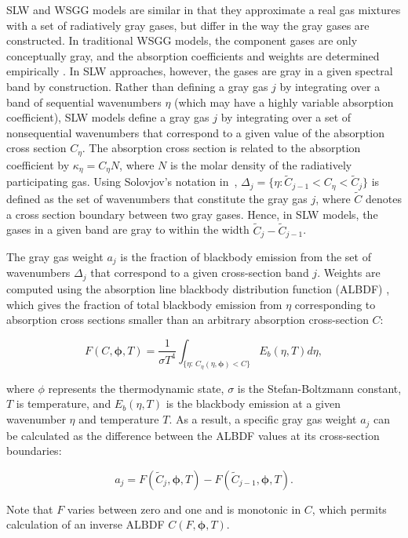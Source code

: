\documentclass[preprint,12pt]{elsarticle}
\newcommand{\BS}{\boldsymbol}
\newcounter{bla}
\begin{document}
SLW and WSGG models are similar in that they approximate a real gas mixtures with a set of radiatively gray gases, but differ in the way the gray gases are constructed. In traditional WSGG models, the component gases are only conceptually gray, and the absorption coefficients and weights are determined empirically \citep{Badger_2019}. In SLW approaches, however, the gases are gray in a given spectral band by construction. Rather than defining a gray gas $j$ by integrating over a band of sequential wavenumbers $\eta$ (which may have a highly variable absorption coefficient), SLW models define a gray gas $j$ by integrating over a set of nonsequential wavenumbers that correspond to a given value of the absorption cross section $C_{\eta}$. The absorption cross section is related to the absorption coefficient by $\kappa_\eta=C_\eta N$, where $N$ is the molar density of the radiatively participating gas.
%
Using Solovjov's notation in~\cite{Solovjov_2017}, $\Delta_j=\{\eta:\tilde{C}_{j-1}<C_\eta<\tilde{C}_j\}$ is defined as the set of wavenumbers that constitute the gray gas $j$, where $\tilde{C}$ denotes a cross section boundary between two gray gases. Hence, in SLW models, the gases in a given band are gray to within the width $\tilde{C}_j-\tilde{C}_{j-1}$.

The gray gas weight $a_j$ is the fraction of blackbody emission from the set of wavenumbers $\Delta_j$ that correspond to a given cross-section band $j$. Weights are computed using the absorption line blackbody distribution function (ALBDF) \cite{Pearson_2014}, which gives the fraction of total blackbody emission from $\eta$ corresponding to absorption cross sections smaller than an arbitrary absorption cross-section $C$: 
%
\begin{linenomath}
    \begin{equation} \label{e:albdf}
        F(C,\BS{\phi},T) = \frac{1}{\sigma T^4}\int_{\{\eta:\,C_\eta(\eta,\BS{\phi})<C\}}E_b(\eta,T)d\eta,
\end{equation}
\end{linenomath}
%
where $\phi$ represents the thermodynamic state, $\sigma$ is the Stefan-Boltzmann constant, $T$ is temperature, and $E_b(\eta,T)$ is the blackbody emission at a given wavenumber $\eta$ and temperature $T$.
As a result, a specific gray gas weight $a_j$ can be calculated as the difference between the ALBDF values at its cross-section boundaries:
%
\begin{linenomath}
    \begin{equation}\label{e:aj}
    a_j = F(\tilde{C}_j,\BS{\phi}, T) - F(\tilde{C}_{j-1}, \BS{\phi},T).
\end{equation}
\end{linenomath}
%
Note that $F$ varies between zero and one and is monotonic in $C$, which permits calculation of an inverse ALBDF $C(F,\BS{\phi},T)$.
\end{document}
